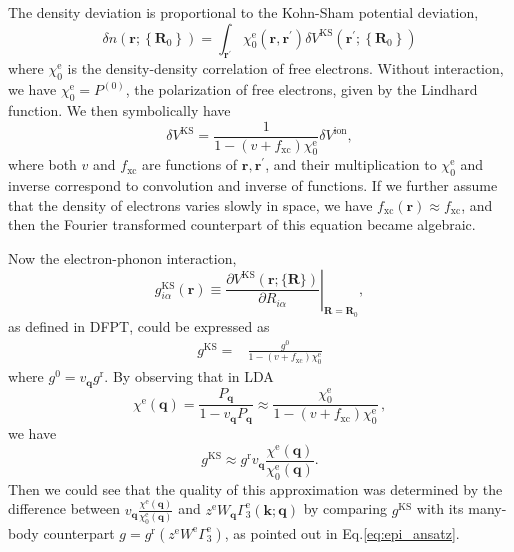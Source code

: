\documentclass[%
 reprint,
superscriptaddress,
 amsmath,amssymb,
 aps,
prx,
]{revtex4-2}
\newcommand{\br}{\mathbf{r}}
\newcommand{\bq}{\mathbf{q}}
\newcommand{\bk}{\mathbf{k}}
\newcommand{\txe}{\text{e}}
\newcommand{\txr}{\text{r}}
\newcommand{\txxc}{\text{xc}}
\newcommand{\txion}{\text{ion}}
\newcommand{\txKS}{\text{KS}}
\begin{document}
\begin{appendices}
The density deviation is proportional to the Kohn-Sham potential deviation,
\begin{equation}
    \delta n\left(\mathbf{r} ;\left\{\mathbf{R}_0\right\}\right)=\int_{\mathbf{r}^{\prime}} \chi^\txe_0\left(\mathbf{r}, \mathbf{r}^{\prime}\right) \delta V^{\txKS}\left(\mathbf{r}^{\prime} ;\left\{\mathbf{R}_0\right\}\right)
\end{equation}
where $\chi^\txe_0$ is the density-density correlation of free electrons. 
Without interaction, we have $\chi^\txe_0=P^{(0)}$, the polarization of free electrons, given by the Lindhard function.
We then symbolically have
\begin{equation}
\delta V^{\txKS}=\frac{1}{1-\left(v+f_{\txxc}\right) \chi^\txe_0}\delta V^{\txion},
\end{equation}
where both $v$ and $f_\txxc$ are functions of $\br,\br^\prime$, and their multiplication to $\chi^\txe_0$ and inverse correspond to convolution and inverse of functions. 
If we further assume that the density of electrons varies slowly in space, we have $f_{\txxc}\left(\mathbf{r}\right)\approx f_{\txxc}$, and then the Fourier transformed counterpart of this equation became algebraic.

Now the electron-phonon interaction,
\begin{equation}
\left. g^{\txKS}_{i \alpha}(\mathbf{r}) \equiv \frac{\partial V^{\txKS}(\mathbf{r} ;\{\mathbf{R}\})}{\partial R_{i \alpha}}\right|_{\mathbf{R}=\mathbf{R}_0},
\end{equation}
as defined in DFPT, 
could be expressed as 
\begin{equation}
\begin{aligned}
g^{\txKS}=& \frac{g^0}{1-\left(v+f_{\txxc}\right) \chi^\txe_0}
\end{aligned}
\end{equation}
where $g^0=v_\bq g^\txr$.
By observing that in LDA
\[\chi^\txe(\bq)=\frac{P_\bq}{1-v_\bq P_\bq}\approx\frac{\chi^\txe_0}{1-\left(v+f_{\txxc}\right) \chi^\txe_0} \, ,
\]
we have
\begin{equation}
  g^{\txKS}\approx g^\txr v_\bq \frac{\chi^\txe(\bq)}{\chi_0^\txe(\bq)}.
\end{equation}
Then we could see that the quality of this approximation was determined by the difference between $v_\bq\frac{\chi^\txe(\bq)}{\chi_0^\txe(\bq)}$ and $z^\txe W_\bq\Gamma^\txe_3(\bk;\bq)$ by comparing $g^{\txKS}$ with its many-body counterpart $g=g^\txr\left(z^\txe W^\txe \Gamma^\txe_3\right)$, as pointed out in Eq.\eqref{eq:epi_ansatz}.




\end{appendices}
\end{document}
